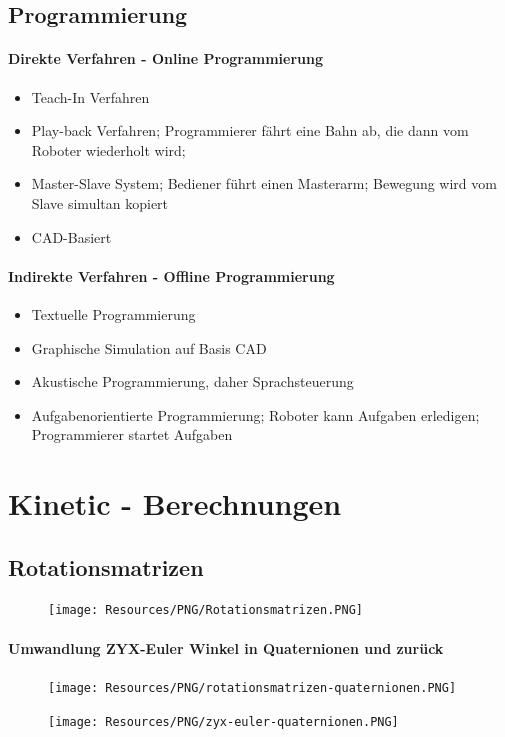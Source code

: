 \subsection{Programmierung}
\paragraph{Direkte Verfahren - Online Programmierung}
\begin{itemize}
	\item Teach-In Verfahren
	\item Play-back Verfahren; Programmierer fährt eine Bahn ab, die dann vom Roboter wiederholt wird;
	\item Master-Slave System; Bediener führt einen Masterarm; Bewegung wird vom Slave simultan kopiert
	\item CAD-Basiert
\end{itemize}
\paragraph{Indirekte Verfahren - Offline Programmierung}
\begin{itemize}
	\item Textuelle Programmierung
	\item Graphische Simulation auf Basis CAD
	\item Akustische Programmierung, daher Sprachsteuerung
	\item Aufgabenorientierte Programmierung; Roboter kann Aufgaben erledigen; Programmierer startet Aufgaben
\end{itemize}
\section{Kinetic - Berechnungen}
\subsection{Rotationsmatrizen}
\begin{figure}[H]
	\begin{center}
		\texttt{[image: Resources/PNG/Rotationsmatrizen.PNG]}
		\caption{}
		\label{fig:PNG/Rotationsmatrizen.PNG}
	\end{center}
\end{figure}
\paragraph{Umwandlung ZYX-Euler Winkel in Quaternionen und zurück}
\begin{figure}[H]
	\begin{center}
		\texttt{[image: Resources/PNG/rotationsmatrizen-quaternionen.PNG]}
		\caption{}
		\label{fig:PNG/quaternionen-rotationsmatrizen.PNG}
	\end{center}
\end{figure}
\begin{figure}[H]
	\begin{center}
		\texttt{[image: Resources/PNG/zyx-euler-quaternionen.PNG]}
		\caption{}
		\label{fig:PNG/zyx-euler-quaternionen.PNG}
	\end{center}
\end{figure}
